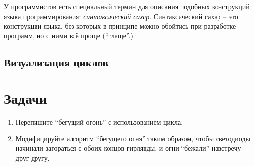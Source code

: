 \documentclass[../sparc.tex]{subfiles}
\begin{document}
У программистов есть специальный термин для описания подобных конструкций языка
программирования: \emph{синтаксический сахар}.  Синтаксический сахар -- это
конструкции языка, без которых в принципе можно обойтись при разработке
программ, но с ними всё проще (``слаще''.)

\subsection{Визуализация циклов}

\section{Задачи}
\begin{enumerate}
\item Перепишите ``бегущий огонь'' с использованием цикла.
\item Модифицируйте алгоритм ``бегущего огня'' таким образом, чтобы светодиоды
  начинали загораться с обоих концов гирлянды, и огни ``бежали'' навстречу друг
  другу.
\end{enumerate}
\end{document}

